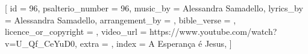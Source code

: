 

[
    id                     = {96},
    psalterio_number       = {96},
    music_by               = {Alessandra Samadello},
    lyrics_by              = {Alessandra Samadello},
    arrangement_by         = {},
    bible_verse            = {},
    licence_or_copyright   = {},
    video_url              = {https://www.youtube.com/watch?v=U_Qf_CeYuD0},
    extra                  = {},
    index                  = {A Esperança é Jesus},
]

\beginverse

